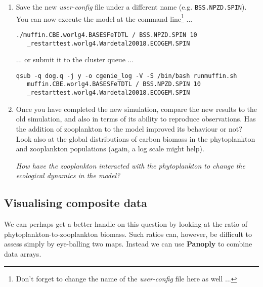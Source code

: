 \documentclass[11pt,fleqn]{book} %
\begin{document}
\begin{enumerate}[noitemsep]
\vspace{1mm}
\item Save the new \textit{user-config} file under a different name (e.g. \texttt{BSS.NPZD.SPIN}). You can now execute the model at the command line\footnote{Don't forget to change the name of the \textit{user-config} file here as well ...} ... 
\small\begin{verbatim}
./muffin.CBE.worlg4.BASESFeTDTL / BSS.NPZD.SPIN 10 
   _restarttest.worlg4.Wardetal20018.ECOGEM.SPIN
\end{verbatim}\normalsize
... or submit it to the cluster queue ...
\small\begin{verbatim}
qsub -q dog.q -j y -o cgenie_log -V -S /bin/bash runmuffin.sh 
   muffin.CBE.worlg4.BASESFeTDTL / BSS.NPZD.SPIN 10 
   _restarttest.worlg4.Wardetal20018.ECOGEM.SPIN
\end{verbatim}\normalsize

\vspace{1mm}
\item Once you have completed the new simulation, compare the new results to the old simulation, and also in terms of its ability to reproduce observations. Has the addition of zooplankton to the model improved its behaviour or not? Look also at the global distributions of carbon biomass in the phytoplankton and zooplankton populations (again, a log scale might help).

\vspace{1mm}
\textit{How have the zooplankton interacted with the phytoplankton to change the ecological dynamics in the model?}

\end{enumerate}
\vspace{2mm}


\subsection{Visualising composite data}

We can perhaps get a better handle on this question by looking at the ratio of phytoplankton-to-zooplankton biomass. Such ratios can, however, be difficult to assess simply by eye-balling two maps. Instead we can use \textbf{Panoply} to combine data arrays.
\end{document}
